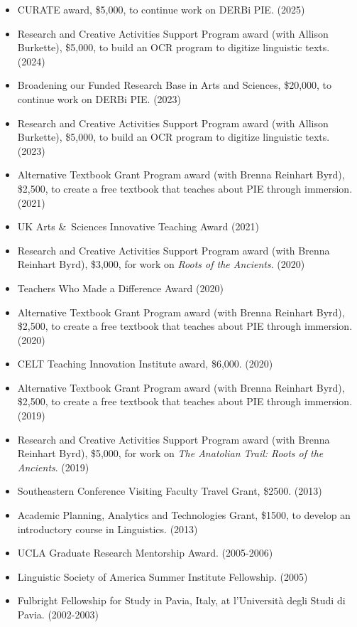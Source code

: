 \documentclass[paper=letter,fontsize=11pt]{scrartcl}
\begin{document}
\begin{itemize}
\item CURATE award, \$5,000, to continue work on DERBi PIE. (2025)
\item Research and Creative Activities Support Program award (with Allison Burkette), \$5,000, to build an OCR program to digitize linguistic texts. (2024)
\item Broadening our Funded Research Base in Arts and Sciences, \$20,000, to continue work on DERBi PIE. (2023)
\item Research and Creative Activities Support Program award (with Allison Burkette), \$5,000, to build an OCR program to digitize linguistic texts. (2023)
\item Alternative Textbook Grant Program award (with Brenna Reinhart Byrd), \$2,500, to create a free textbook that teaches about PIE through immersion. (2021)
\item UK Arts \&~Sciences Innovative Teaching Award (2021)
\item Research and Creative Activities Support Program award (with Brenna Reinhart Byrd), \$3,000, for work on {\it Roots of the Ancients}. (2020)
\item Teachers Who Made a Difference Award (2020)
\item Alternative Textbook Grant Program award (with Brenna Reinhart Byrd), \$2,500, to create a free textbook that teaches about PIE through immersion. (2020)
\item CELT Teaching Innovation Institute award, \$6,000. (2020)
\item Alternative Textbook Grant Program award (with Brenna Reinhart Byrd), \$2,500, to create a free textbook that teaches about PIE through immersion. (2019)
\item Research and Creative Activities Support Program award (with Brenna Reinhart Byrd), \$5,000, for work on {\it The Anatolian Trail: Roots of the Ancients}. (2019)
\item Southeastern Conference Visiting Faculty Travel Grant, \$2500. (2013)
\item Academic Planning, Analytics and Technologies Grant, \$1500, to develop an introductory course in Linguistics. (2013)
\item UCLA Graduate Research Mentorship Award. (2005-2006)
\item Linguistic Society of America Summer Institute Fellowship. (2005)
\item Fulbright Fellowship for Study in Pavia, Italy, at l'Università degli Studi di Pavia. (2002-2003)
\end{itemize}
\end{document}
